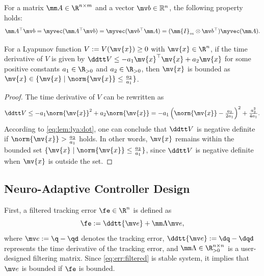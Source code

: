 \documentclass[journal]{IEEEtran}
\begin{document}
\begin{propsit} \label{propsit:kron}
	For a matrix $\mm A\in\R^{n\times m}$ and a vector $\mv b\in\mathbb R^n$, the following property holds:
	\begin{equation}
		\mm A^\top \mv b 
		= 
		\myvec(\mm A^\top\mv b)
		=
		\myvec(\mv b^\top\mm A)
		= 
		(\mm{I}_{m}\otimes \mv b^\top) \myvec(\mm A)
		.
	\end{equation}
\end{propsit}


\begin{lem} \label{lem:stable:set}
    For a Lyapunov function $V:=V(\mv{x})\ge0$ with $\mv{x}\in\R^n$, if the time derivative of $V$ is given by $\ddtt V\le -a_1 \mv{x}^\top \mv{x} + a_2 \mv{x}$ for some positive constants $a_1\in\R_{>0}$ and $a_2\in\R_{>0}$, then $\mv{x}$ is bounded as $\mv{x}\in\{\mv{x}\mid\norm{\mv{x}}\le\tfrac{a_2}{a_1}\}$.
\end{lem}

\begin{proof}
    The time derivative of $V$ can be rewritten as
    \begin{equation}
        \ddtt V
        \le
        -a_1 \norm{\mv{x}}^2 + a_2 \norm{\mv{x}}
        =
        -a_1
        \left(
            \norm{\mv{x}}-\tfrac{a_2}{2a_1}
        \right)^2
        +
        \tfrac{a_2^2}{4a_1}
        .
        \label{eq:lem:lya:dot}
    \end{equation}
    According to \eqref{eq:lem:lya:dot}, one can conclude that $\ddtt V$ is negative definite if $\norm{\mv{x}}>\tfrac{a_2}{a_1}$ holds.
    In other words, $\mv{x}$ remains within the bounded set $\{\mv{x}\mid\norm{\mv{x}}\le\tfrac{a_2}{a_1}\}$, since $\ddtt V$ is negative definite when $\mv{x}$ is outside the set.
\end{proof}


\subsection{Neuro-Adaptive Controller Design}\label{sec:sub:NAC}

First, a filtered tracking error $\fe\in\R^n$ is defined as 
\begin{equation}
    \fe := \ddtt{\mv e}+\mm\Lambda \mv e
    ,
    \label{eq:err:filtered}
\end{equation}
where $\mv e := \q - \qd$ denotes the tracking error, $\ddtt{\mv e} := \dq - \dqd$ represents the time derivative of the tracking error, and $\mm\Lambda\in\R^{n\times n}_{>0}$ is a user-designed filtering matrix.
Since \eqref{eq:err:filtered} is stable system, it implies that $\mv e$ is bounded if $\fe$ is bounded.
\end{document}
